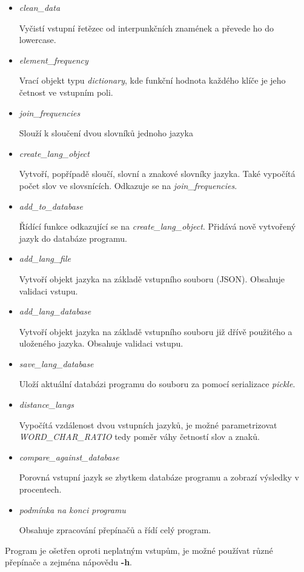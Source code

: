 \documentclass[11pt]{article}
\begin{document}
\begin{itemize}
\item \textit{clean\_data}

Vyčistí vstupní řetězec od interpunkčních znamének a převede ho do lowercase.
\item \textit{element\_frequency}

Vrací objekt typu \textit{dictionary}, kde funkční hodnota každého klíče je jeho četnost ve vstupním poli.
\item \textit{join\_frequencies}

Slouží k sloučení dvou slovníků jednoho jazyka
\item \textit{create\_lang\_object}

Vytvoří, popřípadě sloučí, slovní a znakové slovníky jazyka. Také vypočítá počet slov ve slovsnících. Odkazuje se na \textit{join\_frequencies}.
\item \textit{add\_to\_database}

Řídící funkce odkazující se na \textit{create\_lang\_object}. Přidává nově vytvořený jazyk do databáze programu.
\item \textit{add\_lang\_file}

Vytvoří objekt jazyka na základě vstupního souboru (JSON). Obsahuje validaci vstupu.
\item \textit{add\_lang\_database}

Vytvoří objekt jazyka na základě vstupního souboru již dřívě použitého a uloženého jazyka. Obsahuje validaci vstupu.
\item \textit{save\_lang\_database}

Uloží aktuální databázi programu do souboru za pomocí serializace \textit{pickle}.
\item \textit{distance\_langs}

Vypočítá vzdálenost dvou vstupních jazyků, je možné parametrizovat \textit{WORD\_CHAR\_RATIO} tedy poměr váhy četností slov a znaků.
\item \textit{compare\_against\_database}

Porovná vstupní jazyk se zbytkem databáze programu a zobrazí výsledky v procentech.
\item \textit{podmínka na konci programu}

Obsahuje zpracování přepínačů a řídí celý program.
\end{itemize}

Program je ošetřen oproti neplatným vstupům, je možné používat různé přepínače a zejména nápovědu \textbf{-h}.
\end{document}
